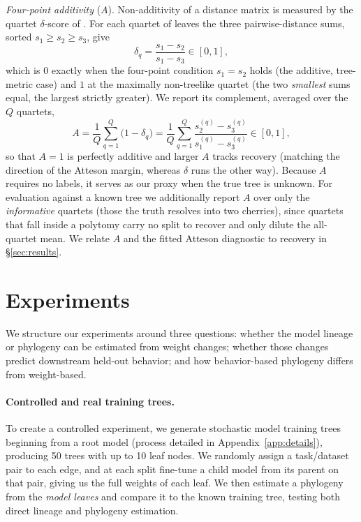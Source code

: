 \documentclass{article}
\theoremstyle{definition}
\theoremstyle{plain}
\begin{document}
\textit{Four-point additivity} ($A$). Non-additivity of a distance matrix is measured by the quartet
$\delta$-score of \citet{holland2002delta}. For each quartet of leaves the three pairwise-distance sums,
sorted $s_1\ge s_2\ge s_3$, give
\[
  \delta_q=\frac{s_1-s_2}{s_1-s_3}\in[0,1] ,
\]
which is $0$ exactly when the four-point condition $s_1=s_2$ holds \citep{sempleSteel2003phylogenetics}
(the additive, tree-metric case) and $1$ at the maximally non-treelike quartet (the two \emph{smallest}
sums equal, the largest strictly greater). We report its complement, averaged over the $Q$ quartets,
\[
  A=\frac{1}{Q}\sum_{q=1}^{Q}\bigl(1-\delta_q\bigr)
   =\frac{1}{Q}\sum_{q=1}^{Q}\frac{s_2^{(q)}-s_3^{(q)}}{s_1^{(q)}-s_3^{(q)}}\in[0,1] ,
\]
so that $A=1$ is perfectly additive and larger $A$ tracks recovery (matching the direction of the
Atteson margin, whereas $\delta$ runs the other way). Because $A$ requires no labels,
it serves as our proxy when the true tree is unknown. For evaluation against a known tree we
additionally report $A$ over only the \emph{informative} quartets (those the truth resolves into two
cherries), since quartets that fall inside a polytomy carry no split to recover and only dilute the
all-quartet mean. We relate $A$ and the fitted Atteson diagnostic to recovery in \S\ref{sec:results}.


\section{Experiments}
\label{sec:experiments}
We structure our experiments around three questions: whether the model lineage or phylogeny can be
estimated from weight changes; whether those changes predict downstream held-out behavior; and
how behavior-based phylogeny differs from weight-based.

\paragraph{Controlled and real training trees.}
\label{sec:exp:trees}

To create a controlled experiment, we generate stochastic model training trees beginning from a root model (process detailed in Appendix~\ref{app:details}), producing 50 trees with up to 10 leaf nodes. We randomly assign a task/dataset pair to each edge, and at each split fine-tune a child model from its parent on that pair, giving us the full weights of each leaf. We then estimate a phylogeny from the \textit{model leaves} and compare it to the known training tree, testing both direct lineage and phylogeny estimation.
\end{document}
